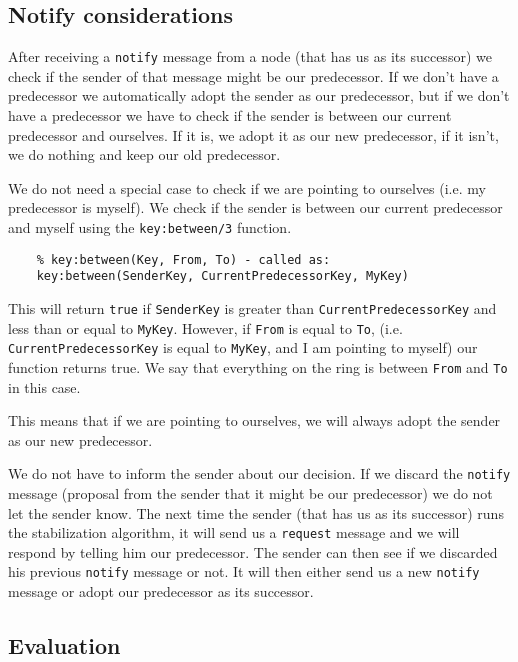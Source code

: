 \documentclass[a4paper, 11pt]{article}
\begin{document}
\subsection{Notify considerations}

After receiving a \texttt{notify} message from a node (that has us as its successor) we check if the sender of that message might be our predecessor. If we don't have a predecessor we automatically adopt the sender as our predecessor, but if we don't have a predecessor we have to check if the sender is between our current predecessor and ourselves. If it is, we adopt it as our new predecessor, if it isn't, we do nothing and keep our old predecessor.

We do not need a special case to check if we are pointing to ourselves (i.e. my predecessor is myself). We check if the sender is between our current predecessor and myself using the \texttt{key:between/3} function.

\begin{verbatim}
    % key:between(Key, From, To) - called as:
    key:between(SenderKey, CurrentPredecessorKey, MyKey)
\end{verbatim}

This will return \texttt{true} if \texttt{SenderKey} is greater than \texttt{CurrentPredecessorKey} and less than or equal to \texttt{MyKey}.
However, if \texttt{From} is equal to \texttt{To}, (i.e. \texttt{CurrentPredecessorKey} is equal to \texttt{MyKey}, and I am pointing to myself) our function returns true. We say that everything on the ring is between \texttt{From} and \texttt{To} in this case.

This means that if we are pointing to ourselves, we will always adopt the sender as our new predecessor.

We do not have to inform the sender about our decision. If we discard the \texttt{notify} message (proposal from the sender that it might be our predecessor) we do not let the sender know. The next time the sender (that has us as its successor) runs the stabilization algorithm, it will send us a \texttt{request} message and we will respond by telling him our predecessor. The sender can then see if we discarded his previous \texttt{notify} message or not. It will then either send us a new \texttt{notify} message or adopt our predecessor as its successor.

\subsection{Evaluation}
\end{document}
